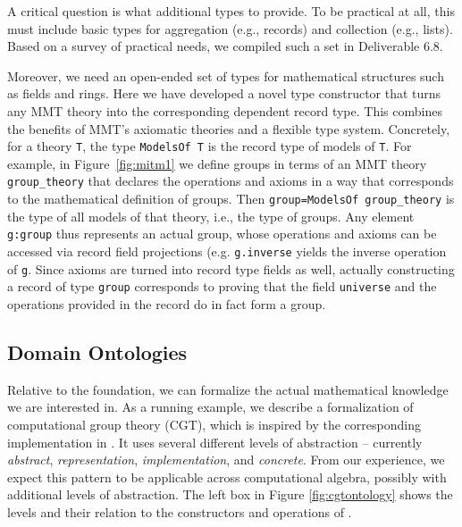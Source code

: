 
A critical question is what additional types to provide.
To be practical at all, this must include basic types for aggregation (e.g., records) and collection (e.g., lists).
Based on a survey of practical needs, we compiled such a set in Deliverable 6.8.

Moreover, we need an open-ended set of types for mathematical structures such as fields and rings.
Here we have developed a novel type constructor  that turns any MMT theory into the corresponding dependent record type.
This combines the benefits of MMT's axiomatic theories and a flexible type system.
Concretely, for a theory \lstinline|T|, the type \lstinline|ModelsOf T| is the record type of models of \lstinline|T|.
For example, in Figure~\ref{fig:mitm1} we define groups in terms of an MMT theory \lstinline|group_theory| that declares the operations and axioms in a way that corresponds to the mathematical definition of groups.
Then \lstinline|group=ModelsOf group_theory| is the type of all models of that theory, i.e., the type of groups.
Any element \lstinline|g:group| thus represents an actual group, whose operations and axioms can be accessed via record field projections (e.g. \lstinline|g.inverse| yields the inverse operation of \lstinline|g|.
Since axioms are turned into record type fields as well, actually constructing a record of type \lstinline|group| corresponds to proving that the field \lstinline|universe| and the operations provided in the record do in fact form a group.

\subsection{Domain Ontologies}

Relative to the foundation, we can formalize the actual mathematical knowledge we are interested in.
As a running example, we describe a formalization of computational group theory (CGT), which is inspired by the corresponding implementation in \GAP.
It uses several different levels of abstraction -- currently \emph{abstract}, \emph{representation}, \emph{implementation}, and \emph{concrete}.
From our experience, we expect this pattern to be applicable across computational algebra, possibly with additional levels of abstraction. 
The left box in Figure \ref{fig:cgtontology} shows the levels and their relation to the constructors and operations of \GAP.

